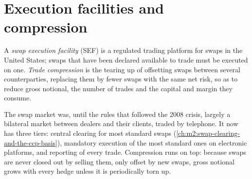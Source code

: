 \section{Execution facilities and compression}

\begin{definition}\label{def:m2:interest-rate-swaps:sef}
A \emph{swap execution facility} (SEF) is a
regulated trading platform for swaps in the United States; swaps that have
been declared available to trade must be executed on one. \emph{Trade
compression} is the tearing up of offsetting swaps
between several counterparties, replacing them by fewer swaps with the same
net risk, so as to reduce gross notional, the number of trades and the
capital and margin they consume.
\end{definition}

The swap market was, until the rules that followed the 2008 crisis, largely a
bilateral market between dealers and their clients, traded by telephone. It now has three tiers:
central clearing for most standard swaps (\cref{ch:m2:swap-clearing-and-the-ccp-basis}),
mandatory execution of the most standard ones on electronic platforms, and
reporting of every trade. Compression runs on top: because swaps are never
closed out by selling them, only offset by new swaps, gross notional grows
with every hedge unless it is periodically torn up.

\begin{omfigure}

\label{fig:m2:interest-rate-swaps:compression}
\end{omfigure}

